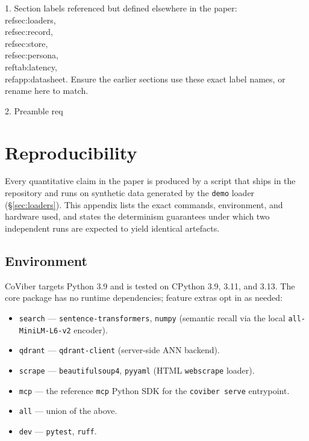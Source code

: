 1. Section labels referenced but defined elsewhere in the paper: \\ref{sec:loaders}, \\ref{sec:record}, \\ref{sec:store}, \\ref{sec:persona}, \\ref{tab:latency}, \\ref{app:datasheet}. Ensure the earlier sections use these exact label names, or rename here to match.

2. Preamble req

\appendix

\section{Reproducibility}
\label{app:reproducibility}

Every quantitative claim in the paper is produced by a script that ships in the
repository and runs on synthetic data generated by the \texttt{demo} loader
(\S\ref{sec:loaders}). This appendix lists the exact commands, environment,
and hardware used, and states the determinism guarantees under which two
independent runs are expected to yield identical artefacts.

\subsection{Environment}
\label{app:env}

CoViber targets Python 3.9 and is tested on CPython 3.9, 3.11, and 3.13. The
core package has no runtime dependencies; feature extras opt in as needed:

\begin{itemize}
  \item \texttt{search} --- \texttt{sentence-transformers}, \texttt{numpy}
        (semantic recall via the local \texttt{all-MiniLM-L6-v2} encoder).
  \item \texttt{qdrant} --- \texttt{qdrant-client} (server-side ANN backend).
  \item \texttt{scrape} --- \texttt{beautifulsoup4}, \texttt{pyyaml}
        (HTML \texttt{webscrape} loader).
  \item \texttt{mcp} --- the reference \texttt{mcp} Python SDK for the
        \texttt{coviber serve} entrypoint.
  \item \texttt{all} --- union of the above.
  \item \texttt{dev} --- \texttt{pytest}, \texttt{ruff}.
\end{itemize}

